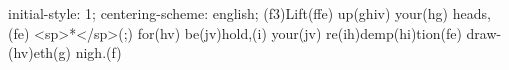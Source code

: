 initial-style: 1;
centering-scheme: english;
(f3)Lift(ffe) up(ghiv) your(hg) heads,(fe) <sp>*</sp>(;) for(hv) be(jv)hold,(i) your(jv) re(ih)demp(hi)tion(fe) draw-(hv)eth(g) nigh.(f)
